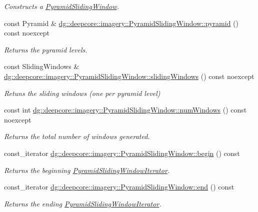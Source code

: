 \begin{DoxyCompactItemize}
\begin{DoxyCompactList}\small\item\em Constructs a \hyperlink{classdg_1_1deepcore_1_1imagery_1_1_pyramid_sliding_window}{Pyramid\+Sliding\+Window}. \end{DoxyCompactList}\item 
const Pyramid \& \hyperlink{group___imagery_module_ga5e94310b058604eb1df583996f97dd14}{dg\+::deepcore\+::imagery\+::\+Pyramid\+Sliding\+Window\+::pyramid} () const noexcept
\begin{DoxyCompactList}\small\item\em Returns the pyramid levels. \end{DoxyCompactList}\item 
const Sliding\+Windows \& \hyperlink{group___imagery_module_gaf36171178d54eeed0b910aede8fd1933}{dg\+::deepcore\+::imagery\+::\+Pyramid\+Sliding\+Window\+::sliding\+Windows} () const noexcept
\begin{DoxyCompactList}\small\item\em Retuns the sliding windows (one per pyramid level) \end{DoxyCompactList}\item 
const int \hyperlink{group___imagery_module_gaced848a3140b83deb89ba3ba522bdfa9}{dg\+::deepcore\+::imagery\+::\+Pyramid\+Sliding\+Window\+::num\+Windows} () const noexcept
\begin{DoxyCompactList}\small\item\em Returns the total number of windows generated. \end{DoxyCompactList}\item 
const\+\_\+iterator \hyperlink{group___imagery_module_gac0245ad134745b2621ecc95ca7aa5219}{dg\+::deepcore\+::imagery\+::\+Pyramid\+Sliding\+Window\+::begin} () const 
\begin{DoxyCompactList}\small\item\em Returns the beginning \hyperlink{classdg_1_1deepcore_1_1imagery_1_1_pyramid_sliding_window_iterator}{Pyramid\+Sliding\+Window\+Iterator}. \end{DoxyCompactList}\item 
const\+\_\+iterator \hyperlink{group___imagery_module_gaf39101c886a6ca5194201848f7d6d831}{dg\+::deepcore\+::imagery\+::\+Pyramid\+Sliding\+Window\+::end} () const 
\begin{DoxyCompactList}\small\item\em Returns the ending \hyperlink{classdg_1_1deepcore_1_1imagery_1_1_pyramid_sliding_window_iterator}{Pyramid\+Sliding\+Window\+Iterator}. \end{DoxyCompactList}\item 

\end{DoxyCompactItemize}
